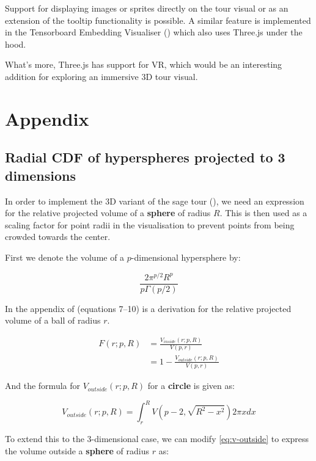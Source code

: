 Support for displaying images or sprites directly on the tour visual or
as an extension of the tooltip functionality is possible. A similar
feature is implemented in the Tensorboard Embedding Visualiser
(\citet{smilkov2016embedding}) which also uses Three.js under the hood.

What's more, Three.js has support for VR, which would be an interesting
addition for exploring an immersive 3D tour visual.

\hypertarget{appendix}{%
\section{Appendix}\label{appendix}}

\hypertarget{app:a}{%
\subsection{Radial CDF of hyperspheres projected to 3
dimensions}\label{app:a}}

In order to implement the 3D variant of the sage tour
(\citet{laa2021burning}), we need an expression for the relative
projected volume of a \textbf{sphere} of radius \(R\). This is then used
as a scaling factor for point radii in the visualisation to prevent
points from being crowded towards the center.

First we denote the volume of a \(p\)-dimensional hypersphere by:

\[
\frac{2\pi^{p/2}R^p}{p\Gamma(p/2)}
\]

In the appendix of \citet{laa2020hole} (equations 7--10) is a derivation
for the relative projected volume of a ball of radius \(r\).

\begin{align}
    F(r; p, R) &= \frac{V_{inside}(r; p, R)}{ V(p, r) } \\
    &= 1 - \frac{V_{outside}(r; p, R)}{ V(p, r) }
    \label{eq:F2}
\end{align}

And the formula for \(V_{outside}(r; p, R)\) for a \textbf{circle} is
given as:

\begin{equation}
V_{outside}(r; p, R) =
\int_r^R V(p-2, \sqrt{R^2 - x^2})2\pi x dx 
\label{eq:v-outside}
\end{equation}

To extend this to the 3-dimensional case, we can modify
\eqref{eq:v-outside} to express the volume outside a \textbf{sphere} of
radius \(r\) as:

